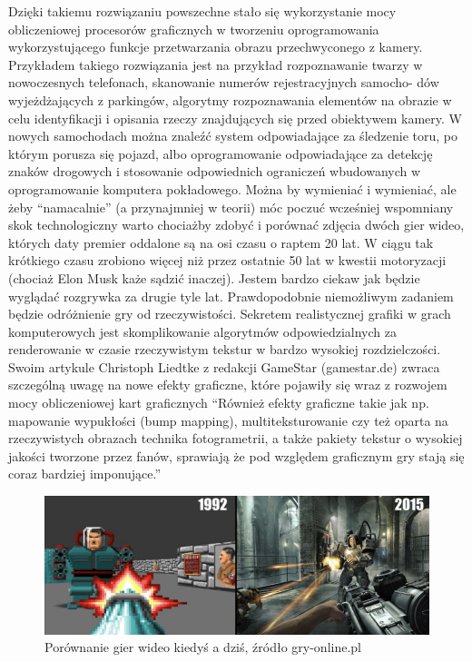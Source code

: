 \documentclass{article}
\begin{document}
	\par
	Dzięki takiemu rozwiązaniu powszechne stało się wykorzystanie mocy obliczeniowej procesorów graficznych w tworzeniu oprogramowania wykorzystującego funkcje przetwarzania obrazu przechwyconego z kamery. Przykładem takiego rozwiązania jest na przykład rozpoznawanie twarzy w nowoczesnych telefonach, skanowanie numerów rejestracyjnych samocho- dów wyjeżdżających z parkingów, algorytmy rozpoznawania elementów na obrazie w celu identyfikacji i opisania rzeczy znajdujących się przed obiektywem kamery. W nowych samochodach można znaleźć system odpowiadające za śledzenie toru, po którym porusza się pojazd, albo oprogramowanie odpowiadające za detekcję znaków drogowych i stosowanie odpowiednich ograniczeń wbudowanych w oprogramowanie komputera pokładowego. Można by wymieniać i wymieniać, ale żeby “namacalnie” (a przynajmniej w teorii) móc poczuć wcześniej wspomniany skok technologiczny warto chociażby zdobyć i porównać zdjęcia dwóch gier wideo, których daty premier oddalone są na osi czasu o raptem 20 lat. W ciągu tak krótkiego czasu zrobiono więcej niż przez ostatnie 50 lat w kwestii motoryzacji (chociaż Elon Musk każe sądzić inaczej). Jestem bardzo ciekaw jak będzie wyglądać rozgrywka za drugie tyle lat. Prawdopodobnie niemożliwym zadaniem będzie odróżnienie gry od rzeczywistości.
	Sekretem realistycznej grafiki w grach komputerowych jest skomplikowanie algorytmów odpowiedzialnych za renderowanie w czasie rzeczywistym tekstur w bardzo wysokiej rozdzielczości. Swoim artykule Christoph Liedtke z redakcji GameStar (gamestar.de) \cite{ref12} zwraca szczególną uwagę na nowe efekty graficzne, które pojawiły się wraz z rozwojem mocy obliczeniowej kart graficznych “Również efekty graficzne takie jak np. mapowanie wypukłości (bump mapping), multiteksturowanie czy też oparta na rzeczywistych obrazach technika fotogrametrii, a także pakiety tekstur o wysokiej jakości tworzone przez fanów, sprawiają że pod względem graficznym gry stają się coraz bardziej imponujące.”\\
	\begin{figure}
		\centering
		\includegraphics{grafika}
		\caption{Porównanie gier wideo kiedyś a dziś, źródło gry-online.pl}
	\end{figure}
\end{document}
